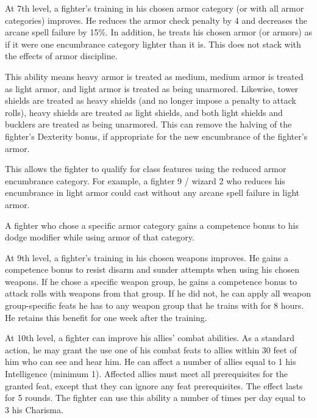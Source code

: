 
 At 7th level, a fighter's training in his chosen armor category (or with all armor categories) improves. He reduces the armor check penalty by 4 and decreases the arcane spell failure by 15\%. In addition, he treats his chosen armor (or armors) as if it were one encumbrance category lighter than it is. This does not stack with the effects of armor discipline.
\par This ability means heavy armor is treated as medium, medium armor is treated as light armor, and light armor is treated as being unarmored. Likewise, tower shields are treated as heavy shields (and no longer impose a  penalty to attack rolls), heavy shields are treated as light shields, and both light shields and bucklers are treated as being unarmored. This can remove the halving of the fighter's Dexterity bonus, if appropriate for the new encumbrance of the fighter's armor.
\par This allows the fighter to qualify for class features using the reduced armor encumbrance category. For example, a fighter 9 / wizard 2 who reduces his encumbrance in light armor could cast without any arcane spell failure in light armor.
\par A fighter who chose a specific armor category gains a  competence bonus to his dodge modifier while using armor of that category.

 At 9th level, a fighter's training in his chosen weapons improves. He gains a  competence bonus to resist disarm and sunder attempts when using his chosen weapons. If he chose a specific weapon group, he gains a  competence bonus to attack rolls with weapons from that group. If he did not, he can apply all weapon group-specific feats he has to any weapon group that he trains with for 8 hours. He retains this benefit for one week after the training.

 At 10th level, a fighter can improve his allies' combat abilities. As a standard action, he may grant the use one of his combat feats to allies within 30 feet of him who can see and hear him. He can affect a number of allies equal to 1 \add his Intelligence (minimum 1). Affected allies must meet all prerequisites for the granted feat, except that they can ignore any feat prerequisites. The effect lasts for 5 rounds. The fighter can use this ability a number of times per day equal to 3 \add his Charisma.

